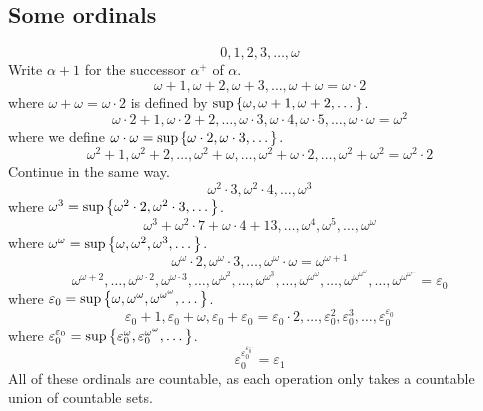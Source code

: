 \subsection{Some ordinals}
\[ 0, 1, 2, 3, \dots, \omega \]
Write \( \alpha + 1 \) for the successor \( \alpha^+ \) of \( \alpha \).
\[ \omega + 1, \omega + 2, \omega + 3, \dots, \omega + \omega = \omega \cdot 2 \]
where \( \omega + \omega = \omega \cdot 2 \) is defined by \( \sup \qty{\omega, \omega + 1, \omega + 2, \dots} \).
\[ \omega \cdot 2 + 1, \omega \cdot 2 + 2, \dots, \omega \cdot 3, \omega \cdot 4, \omega \cdot 5, \dots, \omega \cdot \omega = \omega^2 \]
where we define \( \omega \cdot \omega = \sup \qty{\omega \cdot 2, \omega \cdot 3, \dots} \).
\[ \omega^2 + 1, \omega^2 + 2, \dots, \omega^2 + \omega, \dots, \omega^2 + \omega \cdot 2, \dots, \omega^2 + \omega^2 = \omega^2 \cdot 2 \]
Continue in the same way.
\[ \omega^2 \cdot 3, \omega^2 \cdot 4, \dots, \omega^3 \]
where \( \omega^3 = \sup\qty{\omega^2 \cdot 2, \omega^2 \cdot 3, \dots} \).
\[ \omega^3 + \omega^2 \cdot 7 + \omega \cdot 4 + 13, \dots, \omega^4, \omega^5, \dots, \omega^\omega \]
where \( \omega^\omega = \sup \qty{\omega, \omega^2, \omega^3, \dots} \).
\[ \omega^\omega \cdot 2, \omega^\omega \cdot 3, \dots, \omega^\omega \cdot \omega = \omega^{\omega + 1} \]
\[ \omega^{\omega + 2}, \dots, \omega^{\omega \cdot 2}, \omega^{\omega \cdot 3}, \dots, \omega^{\omega^2}, \dots, \omega^{\omega^3}, \dots, \omega^{\omega^\omega}, \dots, \omega^{\omega^{\omega^\omega}}, \dots, \omega^{\omega^{\omega^{\dots}}} = \varepsilon_0 \]
where \( \varepsilon_0 = \sup\qty{\omega, \omega^\omega, \omega^{\omega^\omega}, \dots} \).
\[ \varepsilon_0 + 1, \varepsilon_0 + \omega, \varepsilon_0 + \varepsilon_0 = \varepsilon_0 \cdot 2, \dots, \varepsilon_0^2, \varepsilon_0^3, \dots, \varepsilon_0^{\varepsilon_0} \]
where \( \varepsilon_0^{\varepsilon_0} = \sup\qty{\varepsilon_0^\omega, \varepsilon_0^{\omega^\omega}, \dots} \).
\[ \varepsilon_0^{\varepsilon_0^{\varepsilon_0^{\dots}}} = \varepsilon_1 \]
All of these ordinals are countable, as each operation only takes a countable union of countable sets.

